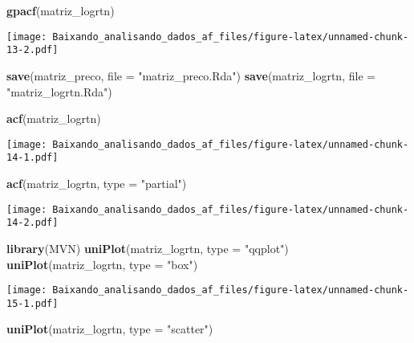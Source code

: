 \documentclass[]{article}
\newenvironment{Shaded}{\begin{snugshade}}{\end{snugshade}}
\newcommand{\KeywordTok}[1]{\textcolor[rgb]{0.13,0.29,0.53}{\textbf{{#1}}}}
\newcommand{\DataTypeTok}[1]{\textcolor[rgb]{0.13,0.29,0.53}{{#1}}}
\newcommand{\StringTok}[1]{\textcolor[rgb]{0.31,0.60,0.02}{{#1}}}
\newcommand{\NormalTok}[1]{{#1}}
\begin{document}
\begin{Shaded}
\begin{Highlighting}[]
\KeywordTok{gpacf}\NormalTok{(matriz_logrtn)}
\end{Highlighting}
\end{Shaded}

\texttt{[image: Baixando\_analisando\_dados\_af\_files/figure-latex/unnamed-chunk-13-2.pdf]}

\begin{Shaded}
\begin{Highlighting}[]
\KeywordTok{save}\NormalTok{(matriz_preco, }\DataTypeTok{file =} \StringTok{"matriz_preco.Rda"}\NormalTok{)}
\KeywordTok{save}\NormalTok{(matriz_logrtn, }\DataTypeTok{file =} \StringTok{"matriz_logrtn.Rda"}\NormalTok{)}
\end{Highlighting}
\end{Shaded}

\begin{Shaded}
\begin{Highlighting}[]
\KeywordTok{acf}\NormalTok{(matriz_logrtn)}
\end{Highlighting}
\end{Shaded}

\texttt{[image: Baixando\_analisando\_dados\_af\_files/figure-latex/unnamed-chunk-14-1.pdf]}

\begin{Shaded}
\begin{Highlighting}[]
\KeywordTok{acf}\NormalTok{(matriz_logrtn, }\DataTypeTok{type =} \StringTok{"partial"}\NormalTok{)}
\end{Highlighting}
\end{Shaded}

\texttt{[image: Baixando\_analisando\_dados\_af\_files/figure-latex/unnamed-chunk-14-2.pdf]}

\begin{Shaded}
\begin{Highlighting}[]
\KeywordTok{library}\NormalTok{(MVN)}
\KeywordTok{uniPlot}\NormalTok{(matriz_logrtn, }\DataTypeTok{type =} \StringTok{"qqplot"}\NormalTok{)}
\KeywordTok{uniPlot}\NormalTok{(matriz_logrtn, }\DataTypeTok{type =} \StringTok{"box"}\NormalTok{)}
\end{Highlighting}
\end{Shaded}

\texttt{[image: Baixando\_analisando\_dados\_af\_files/figure-latex/unnamed-chunk-15-1.pdf]}

\begin{Shaded}
\begin{Highlighting}[]
\KeywordTok{uniPlot}\NormalTok{(matriz_logrtn, }\DataTypeTok{type =} \StringTok{"scatter"}\NormalTok{)}
\end{Highlighting}
\end{Shaded}
\end{document}
